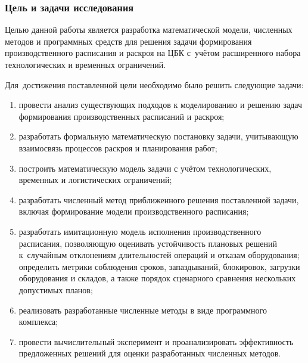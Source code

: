 \begin{frame}[t,allowframebreaks]
    \frametitle{Цель и задачи исследования}

    Целью данной работы является разработка математической модели,
    численных методов и программных средств для решения задачи формирования
    производственного расписания и раскроя на ЦБК
    с~учётом расширенного набора технологических и временных ограничений.

    \vspace{0.2cm}
    Для~достижения поставленной цели необходимо было решить следующие задачи:
    \begin{enumerate}[beginpenalty=10000]
        \item провести анализ существующих подходов к моделированию и решению
        задач формирования производственных расписаний и раскроя;
        \item разработать формальную математическую постановку задачи,
        учитывающую взаимосвязь процессов раскроя и планирования работ;
        \item построить математическую модель задачи с учётом
        технологических, временных и логистических ограничений;
        \item разработать численный метод приближенного решения поставленной задачи,
        включая формирование модели производственного расписания;
        \item разработать имитационную модель исполнения производственного
        расписания, позволяющую оценивать устойчивость плановых решений
        к~случайным отклонениям длительностей операций и отказам оборудования;
        определить метрики соблюдения сроков, запаздываний, блокировок,
        загрузки оборудования и складов, а также порядок сценарного сравнения
        нескольких допустимых планов;
        \item реализовать разработанные численные методы в виде программного комплекса;
        \item провести вычислительный эксперимент и проанализировать
        эффективность предложенных решений для оценки разработанных численных методов.
    \end{enumerate}
\end{frame}

